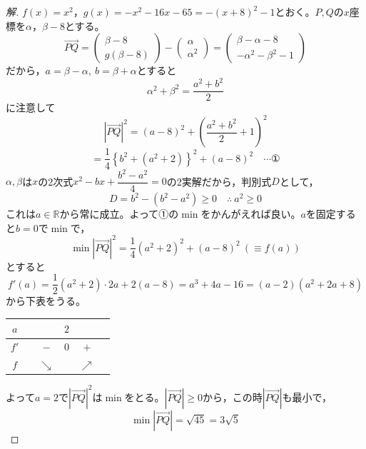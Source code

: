 \documentclass[../main.tex]{subfiles}
\begin{document}
\begin{proof}[解]
  $f(x)=x^2$，$g(x)=-x^2-16x-65=-(x+8)^2-1$とおく。$P,Q$の$x$座標を$\alpha$，$\beta-8$とする。
  \[
    \overrightarrow{PQ}=
    \begin{pmatrix}\beta-8\\g(\beta-8)
    \end{pmatrix}-
    \begin{pmatrix}\alpha\\\alpha^2
    \end{pmatrix}=
    \begin{pmatrix}\beta-\alpha-8\\-\alpha^2-\beta^2-1
    \end{pmatrix}
  \]
  だから，$a=\beta-\alpha,\ b=\beta+\alpha$とすると
  \[
    \alpha^2+\beta^2=\frac{a^2+b^2}{2}
  \]
  に注意して
  \[
    |\overrightarrow{PQ}|^2=(a-8)^2+\left(\frac{a^2+b^2}{2}+1\right)^2
  \]
  \[
    =\frac14\left\{b^2+(a^2+2)\right\}^2+(a-8)^2 \quad\cdots\text{①}
  \]
  $\alpha,\beta$は$x$の2次式$x^2-bx+\dfrac{b^2-a^2}{4}=0$の2実解だから，判別式$D$として，
  \[
    D=b^2-(b^2-a^2)\ge0 \quad\therefore\ a^2\ge0
  \]
  これは$a\in\mathbb{R}$から常に成立。よって①の$\min$をかんがえれば良い。$a$を固定すると$b=0$で$\min$で，
  \[
    \min|\overrightarrow{PQ}|^2=\frac14(a^2+2)^2+(a-8)^2\ (\equiv f(a))
  \]
  とすると
  \[
    f'(a)=\frac12(a^2+2)\cdot2a+2(a-8)=a^3+4a-16=(a-2)(a^2+2a+8)
  \]
  から下表をうる。
  \begin{center}
    \begin{tabular}{c|ccccc}
      $a$ & & & $2$ & & \\
      \hline
      $f'$ & & $-$ & $0$ & $+$ & \\
      \hline
      $f$ & & $\searrow$ & & $\nearrow$ &
    \end{tabular}
  \end{center}
  よって$a=2$で$|\overrightarrow{PQ}|^2$は$\min$をとる。$|\overrightarrow{PQ}|\ge0$から，この時$|\overrightarrow{PQ}|$も最小で，
  \[
    \min|\overrightarrow{PQ}|=\sqrt{45}=3\sqrt5
  \]
\end{proof}
\end{document}
